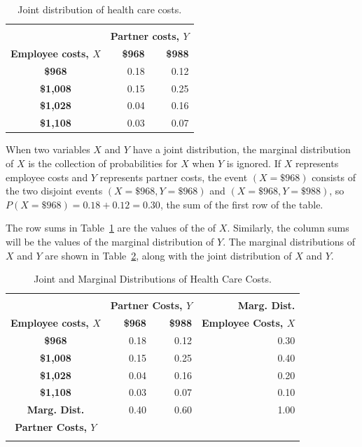\begin{table}[h]
\centering
\begin{tabular}{crr}
  \hline \\
  &   \multicolumn{2}{c}{\textbf{Partner costs, $Y$}} \\
\textbf{Employee costs, $X$} & \textbf{\$968} & \textbf{\$988} \\ 
  \hline
\textbf{\$968} & 0.18 & 0.12 \\ 
 \textbf{\$1,008} & 0.15 & 0.25 \\ 
 \textbf{\$1,028}  & 0.04 & 0.16 \\ 
 \textbf{\$1,108}  & 0.03 & 0.07 \\ 
   \hline
\end{tabular}
\caption{Joint distribution of health care costs.} 
\label{healthExpensesJointDistribution}
\end{table}

When two variables $X$ and $Y$ have a joint distribution, the marginal distribution of $X$ is the collection of probabilities for $X$ when $Y$ is ignored.  If $X$ represents employee costs and $Y$ represents partner costs, the event $(X = \$968)$ consists of the two  disjoint events $(X = \$968, Y = \$968)$ and $(X = \$968, Y = \$988)$, so $P(X = \$968) = 0.18 + 0.12 = 0.30$, the sum of the first row of the table. 

The row sums in Table~\ref{healthExpensesJointDistribution} are the values of the  of $X$. Similarly, the column sums will be the values of the marginal distribution of $Y$.  The marginal distributions of $X$ and $Y$ are shown in Table~\ref{healthExpensesJointMarginalDistribution}, along with the joint distribution of $X$ and $Y$.
\newpage

\begin{table}[h]
\centering
\begin{tabular}{crrr}
  \hline \\
  &   \multicolumn{2}{c}{\textbf{Partner Costs, $Y$}} & \textbf{Marg. Dist.}\\
\textbf{Employee costs, $X$} & \textbf{\$968} & \textbf{\$988} & \textbf{Employee Costs, $X$} \\ 
  \hline
\textbf{\$968} & 0.18 & 0.12 & 0.30\\ 
 \textbf{\$1,008} & 0.15 & 0.25 & 0.40 \\ 
 \textbf{\$1,028}  & 0.04 & 0.16 & 0.20\\ 
 \textbf{\$1,108}  & 0.03 & 0.07  & 0.10\\ 
   \hline
 \textbf{Marg. Dist.} & 0.40 & 0.60 & 1.00 \\
 \textbf{Partner Costs, $Y$} &  &  & \\
 \hline \\
\end{tabular}
\caption{Joint and Marginal Distributions of Health Care Costs.} 
\label{healthExpensesJointMarginalDistribution}
\end{table}

